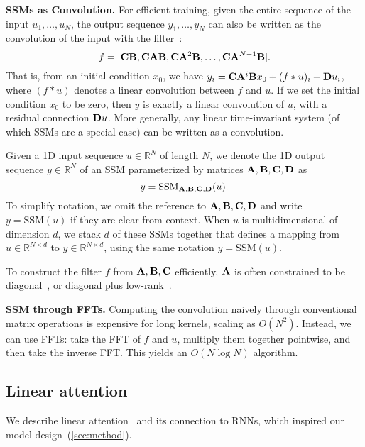 \textbf{SSMs as Convolution.}
For efficient training, given the
entire sequence of the input $u_1, \dots, u_N$, the output sequence
$y_1, \dots, y_N$ can also be written as the convolution of the input with the
filter~\citep{gu2021combining}:
\begin{equation*}
  f = [\mathbf{C} \mathbf{B}, \mathbf{C}\mathbf{A}\mathbf{B}, \mathbf{C}\mathbf{A}^2\mathbf{B}, \dots, \mathbf{C}\mathbf{A}^{N-1}\mathbf{B}].
\end{equation*}
That is, from an initial condition $x_0$, we have
$y_i = \mathbf{C}\mathbf{A}^i\mathbf{B} x_0 + (f \ast u)_i + \mathbf{D} u_i$, where $(f \ast u)$ denotes a
linear convolution between $f$ and $u$.
If we set the initial condition $x_0$ to be zero, then $y$ is exactly a
linear convolution of $u$, with a residual connection $\mathbf{D} u$.
More generally, any linear time-invariant system (of which SSMs are a special case) can
be written as a convolution.

Given a 1D input sequence $u \in \mathbb{R}^{N}$ of length $N$, we denote the 1D output
sequence $y \in \mathbb{R}^N$ of an SSM parameterized by matrices $\mathbf{A}, \mathbf{B}, \mathbf{C}, \mathbf{D}$ as
\begin{equation*}
  y = \mathrm{SSM}_{\mathbf{A}, \mathbf{B}, \mathbf{C}, \mathbf{D}}(u).
\end{equation*}
To simplify notation, we omit the reference to $\mathbf{A}, \mathbf{B}, \mathbf{C}, \mathbf{D}$ and write
$y = \mathrm{SSM}(u)$ if they are clear from context.
When $u$ is multidimensional of dimension $d$, we stack $d$ of these SSMs
together that defines a mapping from $u \in \mathbb{R}^{N \times d}$ to $y \in \mathbb{R}^{N \times d}$, using
the same notation $y = \mathrm{SSM}(u)$.

To construct the filter $f$ from $\mathbf{A}, \mathbf{B}, \mathbf{C}$ efficiently, $\mathbf{A}$ is often constrained to
be diagonal~\citep{gupta2022diagonal,gu2022parameterization}, or diagonal plus
low-rank~\citep{gu2022efficiently}.

\textbf{SSM through FFTs.}
Computing the convolution naively through conventional matrix operations is expensive
for long kernels, scaling as $O(N^2)$.
Instead, we can use FFTs: take the FFT of $f$ and $u$, multiply them together pointwise, and then take the inverse FFT.
This yields an $O(N \log N)$ algorithm.

\subsection{Linear attention}

We describe linear attention~\citep{katharopoulos2020transformers} and its connection to RNNs, which inspired our model design~(\cref{sec:method}).

